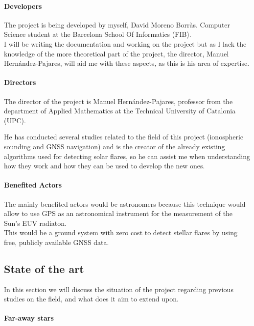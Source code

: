 \paragraph{Developers}

The project is being developed by myself, David Moreno Borràs. Computer Science student at the Barcelona School Of Informatics (FIB).\\

I will be writing the documentation and working on the project but as I lack the knowledge of the more theoretical part of the project, the director, Manuel Hernández-Pajares, will aid me with these aspects, as this is his area of expertise.

\paragraph{Directors}

The director of the project is Manuel Hernández-Pajares, professor from the department of Applied Mathematics at the Technical University of Catalonia (UPC). 

He has conducted several studies related to the field of this project (ionospheric sounding and GNSS navigation) and is the creator of the already existing algorithms used for detecting solar flares, so he can assist me when understanding how they work and how they can be used to develop the new ones.

\paragraph{Benefited Actors}

The mainly benefited actors would be astronomers because this technique would allow to use GPS as an astronomical instrument for the measurement of the Sun’s EUV radiaton.\\

This would be a ground system with zero cost to detect stellar flares by using free, publicly available GNSS data.

\subsection{State of the art}

In this section we will discuss the situation of the project regarding previous studies on the field, and what does it aim to extend upon.          

\paragraph{Far-away stars}

